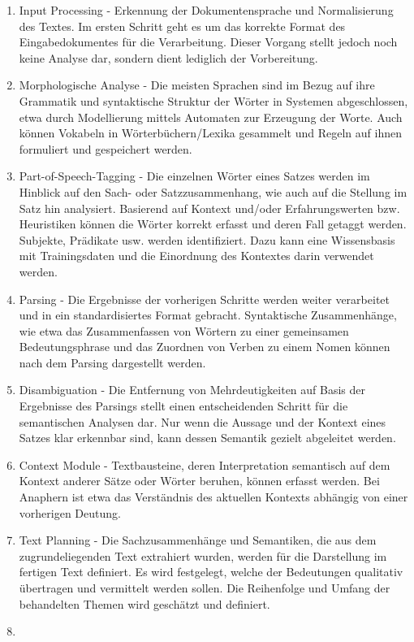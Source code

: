 \documentclass[12pt]{report}
\begin{document}
\begin{enumerate}
\item
Input Processing - Erkennung der Dokumentensprache und Normalisierung des Textes. Im ersten Schritt geht es um das korrekte Format des Eingabedokumentes für die Verarbeitung. Dieser Vorgang stellt jedoch noch keine Analyse dar, sondern dient lediglich der Vorbereitung.
\item
Morphologische Analyse - Die meisten Sprachen sind im Bezug auf ihre Grammatik und syntaktische Struktur der Wörter in Systemen abgeschlossen, etwa durch Modellierung mittels Automaten zur Erzeugung der Worte. Auch können Vokabeln in Wörterbüchern/Lexika gesammelt und Regeln auf ihnen formuliert und gespeichert werden.
\item
Part-of-Speech-Tagging - Die einzelnen Wörter eines Satzes werden im Hinblick auf den Sach- oder Satzzusammenhang, wie auch auf die Stellung im Satz hin analysiert. Basierend auf Kontext und/oder Erfahrungswerten bzw. Heuristiken können die Wörter korrekt erfasst und deren Fall getaggt werden. Subjekte, Prädikate usw. werden identifiziert. Dazu kann eine Wissensbasis mit Trainingsdaten und die Einordnung des Kontextes darin verwendet werden.
\item
Parsing - Die Ergebnisse der vorherigen Schritte werden weiter verarbeitet und in ein standardisiertes Format gebracht. Syntaktische Zusammenhänge, wie etwa das Zusammenfassen von Wörtern zu einer gemeinsamen Bedeutungsphrase und das Zuordnen von Verben zu einem Nomen können nach dem Parsing dargestellt werden.
\item
Disambiguation - Die Entfernung von Mehrdeutigkeiten auf Basis der Ergebnisse des Parsings stellt einen entscheidenden Schritt für die semantischen Analysen dar. Nur wenn die Aussage und der Kontext eines Satzes klar erkennbar sind, kann dessen Semantik gezielt abgeleitet werden.
\item
Context Module - Textbausteine, deren Interpretation semantisch auf dem Kontext anderer Sätze oder Wörter beruhen, können erfasst werden. Bei Anaphern ist etwa das Verständnis des aktuellen Kontexts abhängig von einer vorherigen Deutung.
\item
Text Planning - Die Sachzusammenhänge und Semantiken, die aus dem zugrundeliegenden Text extrahiert wurden, werden für die Darstellung im fertigen Text definiert. Es wird festgelegt, welche der Bedeutungen qualitativ übertragen und vermittelt werden sollen. Die Reihenfolge und Umfang der behandelten Themen wird geschätzt und definiert.
\item

\end{enumerate}
\end{document}
